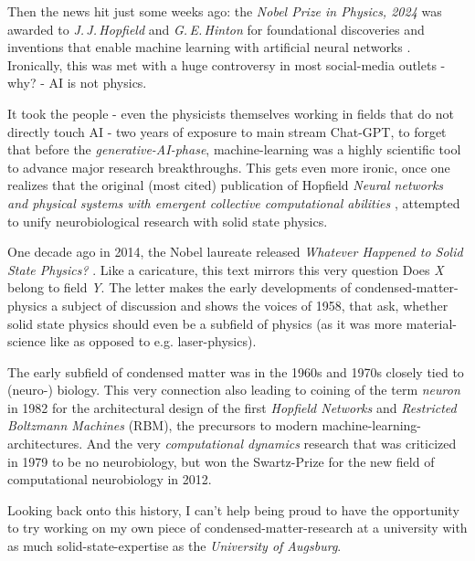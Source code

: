 Then the news hit just some weeks ago: the \emph{Nobel Prize in Physics, 2024} was awarded to \emph{J.\,J.\,Hopfield} and \emph{G.\,E.\,Hinton} \glqq for foundational discoveries and inventions that enable machine learning with artificial neural networks\grqq{} \cite{nobelPrizePhysics2024}.
Ironically, this was met with a huge controversy \cite{NobelPrizeControversy} in most social-media outlets - why? - \glqq AI is not physics\grqq.

It took the people - even the physicists themselves working in fields that do not directly touch AI - two years of exposure to main stream Chat-GPT, to forget that before the \emph{generative-AI-phase}, machine-learning was a highly scientific tool to advance major research breakthroughs.
This gets even more ironic, once one realizes that the original (most cited) publication of Hopfield \emph{\glqq Neural networks and physical systems with emergent collective computational abilities\grqq} \cite{basePaperMachineLearning}, attempted to unify neurobiological research with solid state physics. 

One decade ago in 2014, the Nobel laureate released \emph{\glqq Whatever Happened to Solid State Physics?\grqq} \cite{hopfieldConnectionToSolidStatePhysics}. 
Like a caricature, this text mirrors this very question \glqq Does \emph{X} belong to field \emph{Y}\grqq.
The letter makes the early developments of condensed-matter-physics a subject of discussion and shows the voices of 1958, that ask, whether solid state physics should even be a subfield of physics (as it was more material-science like as opposed to e.g. laser-physics).

The early subfield of condensed matter was in the 1960s and 1970s closely tied to (neuro-) biology. 
This very connection also leading to coining of the term \emph{neuron} in 1982 for the architectural design of the first \emph{Hopfield Networks} and \emph{Restricted Boltzmann Machines} (RBM), the precursors to modern machine-learning-architectures.
And the very \emph{computational dynamics} research that was criticized in 1979 to be \glqq no neurobiology\grqq, but won the Swartz-Prize for the new field of computational neurobiology in 2012.

Looking back onto this history, I can't help being proud to have the opportunity to try working on my own piece of condensed-matter-research at a university with as much solid-state-expertise as the \emph{University of Augsburg}.